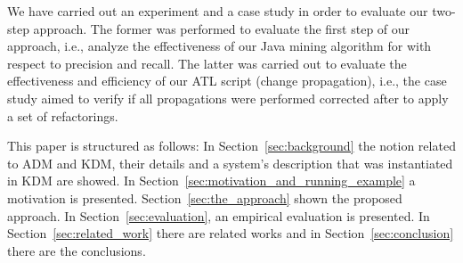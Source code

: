 We have carried out an experiment and a case study in order to evaluate our two-step approach. The former was performed to evaluate the first step of our approach, i.e., analyze the effectiveness of our Java mining algorithm for with respect to precision and recall. The latter was carried out to evaluate the effectiveness and efficiency of our ATL script (change propagation), i.e., the case study aimed to verify if all propagations were performed corrected after to apply a set of refactorings.

This paper is structured as follows: In Section~\ref{sec:background} the notion related to ADM and KDM, their details and a system's description that was instantiated in KDM are showed.
%
%
In Section~\ref{sec:motivation_and_running_example} a motivation is presented. Section~\ref{sec:the_approach} shown the proposed approach. In Section~\ref{sec:evaluation}, an empirical evaluation is presented. In Section~\ref{sec:related_work} there are related works and in Section~\ref{sec:conclusion} there are the conclusions.






